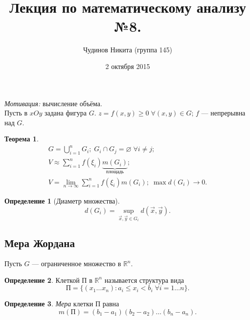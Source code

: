 \documentclass[a4paper,12pt]{article}
\let\emptyset\varnothing
\newtheorem*{theorem}{Теорема}
\theoremstyle{remark}
\theoremstyle{definition}
\newtheorem{definition}{Определение}
\begin{document}
\sloppy
\author{Чудинов Никита (группа 145)}
\date{2 октября 2015}
\title{\vspace{-2.0cm}Лекция по математическому анализу №8.}
\frenchspacing

\maketitle

\emph{Мотивация:} вычисление объёма.\\
Пусть в \(xOy\) задана фигура \(G\). \(z = f(x,y) \geqslant 0\;\forall (x,y) \in G\); \(f\) --- непрерывна над \(G\).

\begin{theorem}
    \begin{gather*}
        G = \bigcup^n_{i = 1} G_i;\; G_i \cap G_j = \emptyset \; \forall i \neq j; \\
        V \approx \sum_{i = 1}^n f(\xi_i) \underbrace{m(G_i)}_{\text{площадь}};\\
        V = \lim_{n \rightarrow \infty} \sum_{i = 1}^n f(\xi_i)m(G_i);\; \max d(G_i) \rightarrow 0.
    \end{gather*}
\end{theorem}

\begin{definition}[Диаметр множества]
    \begin{equation*}
        d(G_i) = \sup_{\vec{x}, \vec{y} \in G_i} d(\vec{x}, \vec{y}).
    \end{equation*}
\end{definition}

\subsection*{Мера Жордана}

Пусть \(G\) --- ограниченное множество в \(\mathbb{R}^n\).

\begin{definition}
    Клеткой П в \(\mathbb{R}^n\) называется структура вида
    \begin{equation*}
        \text{П} = \{(x_1 \ldots x_n): a_i \leqslant x_i < b_i \; \forall i = 1 \ldots n\}.
    \end{equation*}
\end{definition}

\begin{definition}
    \emph{Мера} клетки П равна
    \begin{equation*}
        m(\text{П}) = (b_1 - a_1)(b_2 - a_2) \ldots (b_n - a_n).
    \end{equation*}
\end{definition}
\end{document}

